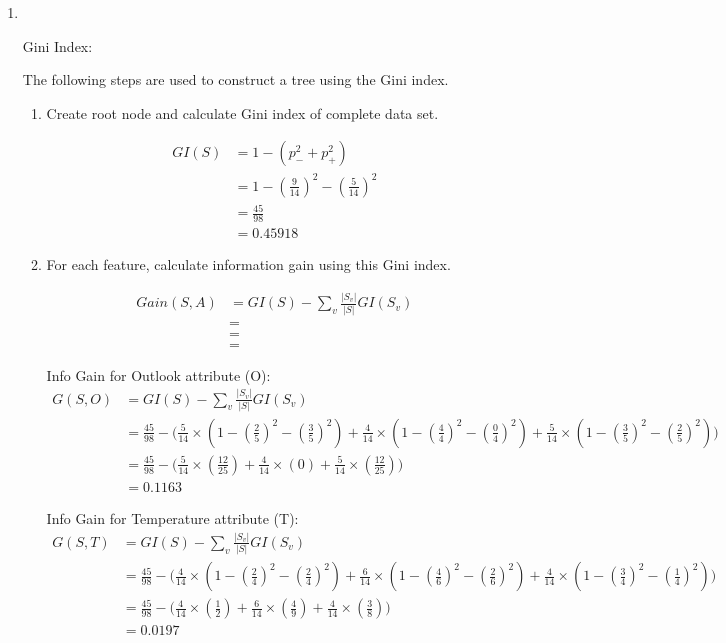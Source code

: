 \documentclass[12pt, fullpage,letterpaper]{article}
\begin{document}
\begin{enumerate}
\begin{enumerate}
\begin{enumerate}
	\end{enumerate}
	
	

\item~

	Gini Index:
	
	The following steps are used to construct a tree using the Gini index.
	
	\begin{enumerate}
		\item Create root node and calculate Gini index of complete data set. 
		
		\[
			\begin{split}
				GI(S) &= 1 - ( p_{-}^2 + p_{+}^2)
					\\
					&= 1 - (\frac{9}{14})^2 - (\frac{5}{14})^2
					\\
					&= \frac{45}{98}
					\\
					&= 0.45918
			\end{split}
		\]
		
		\item For each feature, calculate information gain using this Gini index.
		
		\[
			\begin{split}
				Gain(S,A) &= GI(S) - \sum_v \frac{|S_v|}{|S|} GI(S_v)
					\\
					&=
					\\
					&= 
					\\
					&=
			\end{split}
		\]
		
		Info Gain for Outlook attribute (O):
		\[
        		\begin{split}
        			G(S,O) &= GI(S) - \sum_v \frac{|S_v|}{|S|} GI(S_v)
        					\\
        					&= \frac{45}{98} - \Big( \frac{5}{14}\times (1 - (\frac{2}{5})^2 - (\frac{3}{5})^2) + \frac{4}{14}\times (1 - (\frac{4}{4})^2 - (\frac{0}{4})^2) + \frac{5}{14} \times (1 - (\frac{3}{5})^2 - (\frac{2}{5})^2)\Big)
        					\\
        					&= \frac{45}{98} - \Big( \frac{5}{14}\times (\frac{12}{25}) + \frac{4}{14}\times (0) + \frac{5}{14} \times (\frac{12}{25})\Big)
        					\\
        					&= 0.1163
        		\end{split}
			\]
			
		Info Gain for Temperature attribute (T):
		\[
        		\begin{split}
        			G(S,T) &= GI(S) - \sum_v \frac{|S_v|}{|S|} GI(S_v)
        					\\
        					&= \frac{45}{98} - \Big( \frac{4}{14}\times (1 - (\frac{2}{4})^2 - (\frac{2}{4})^2) + \frac{6}{14}\times (1 - (\frac{4}{6})^2 - (\frac{2}{6})^2) + \frac{4}{14} \times (1 - (\frac{3}{4})^2 - (\frac{1}{4})^2)\Big)
        					\\
        					&= \frac{45}{98} - \Big( \frac{4}{14}\times (\frac{1}{2}) + \frac{6}{14}\times (\frac{4}{9}) + \frac{4}{14} \times (\frac{3}{8})\Big)
        					\\
        					&= 0.0197
        		\end{split}
			\]
			

\end{enumerate}
\end{enumerate}
\end{enumerate}
\end{document}
